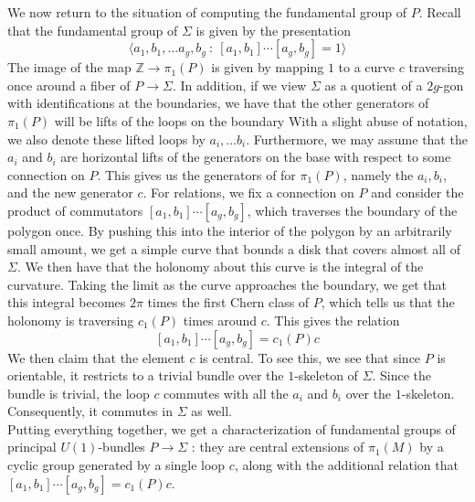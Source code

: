 \documentclass[psamsfonts, 12pt]{amsart}
\theoremstyle{definition}
\theoremstyle{remark}
\newcommand{\Z}{\mathbb{Z}}
\begin{document}
We now return to the situation of computing the fundamental group of $P$. Recall
that the fundamental group of $\Sigma$ is given by the presentation
\[
\langle a_1,b_1,\ldots a_g,b_g ~:~ [a_1,b_1]\cdots[a_g,b_g] = 1\rangle
\]
The image of the map $\Z \to \pi_1(P)$ is given by mapping $1$ to a curve $c$ traversing
once around a fiber of $P \to \Sigma$. In addition, if we view $\Sigma$ as a quotient
of a $2g$-gon with identifications at the boundaries, we have that the other
generators of $\pi_1(P)$ will be lifts of the loops on the boundary With a slight abuse
of notation, we also denote these lifted loops by $a_i,\ldots b_i$. Furthermore, we
may assume that the $a_i$ and $b_i$ are horizontal lifts of the generators on the base
with respect to some connection on $P$. This gives us the generators of for $\pi_1(P)$,
namely the $a_i,b_i$, and the new generator $c$. For relations, we fix a connection on
$P$ and consider the product of commutators $[a_1,b_1]\cdots[a_g,b_g]$, which traverses
the boundary of the polygon once. By pushing this into the interior of the polygon by an
arbitrarily small amount, we get a simple  curve that bounds a disk that covers almost
all of $\Sigma$. We then have that the holonomy about this curve is the integral of the
curvature. Taking the limit as the curve approaches the boundary, we get that this
integral becomes $2\pi$ times the first Chern class of $P$, which tells us that the
holonomy is traversing $c_1(P)$ times around $c$. This gives the relation
\[
[a_1,b_1]\cdots[a_g,b_g] = c_1(P)c
\]
We then claim that the element $c$ is central. To see this, we see that since $P$
is orientable, it restricts to a trivial bundle over the $1$-skeleton of $\Sigma$.
Since the bundle is trivial, the loop $c$ commutes with all the $a_i$ and $b_i$
over the $1$-skeleton. Consequently, it commutes in $\Sigma$ as well. \\

Putting everything together, we get a characterization of fundamental
groups of principal $U(1)$-bundles $P \to \Sigma$ : they are central extensions
of $\pi_1(M)$ by a cyclic group generated by a single loop $c$, along with
the additional relation that $[a_1,b_1]\cdots [a_g,b_g] = c_1(P)c$.
%
\end{document}
